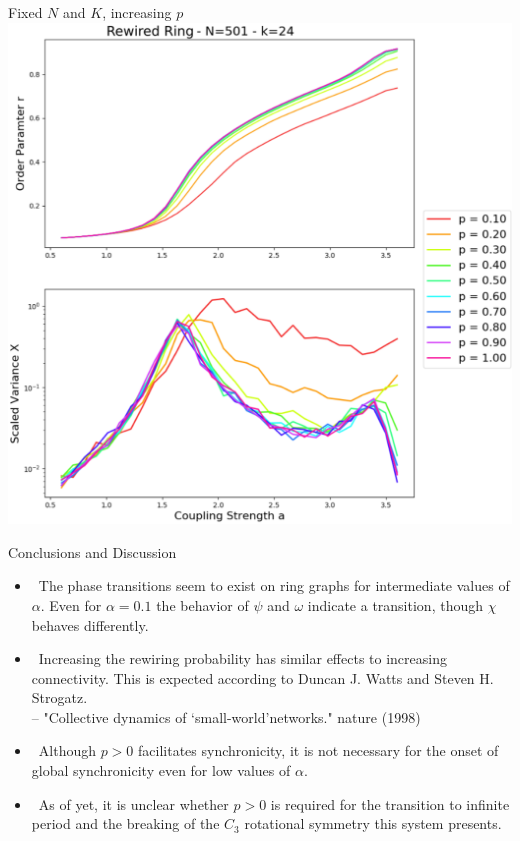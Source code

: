 \documentclass[serif,mathserif]{beamer}
\begin{document}
\begin{frame}
    \centering
    Fixed $N$ and $K$, increasing $p$\\
    \vspace{0.25cm}
    \includegraphics[height=0.8\textheight]{./rvsavsp.eps}
\end{frame}

\begin{frame}{Conclusions and Discussion}
    \begin{itemize}
        \item \ \pause The phase transitions seem to exist on ring graphs for intermediate values of $\alpha$. Even for $\alpha=0.1$ the behavior of $\psi$ and $\omega$ indicate a transition, though $\chi$ behaves differently.
        \vspace{0.1cm}
        \item \ \pause Increasing the rewiring probability has similar effects to increasing connectivity. This is expected according to Duncan J. Watts and Steven H. Strogatz.\\
            \hfill -- "Collective dynamics of ‘small-world’networks." nature (1998)
        \vspace{0.1cm}
        \item \ \pause Although $p>0$ facilitates synchronicity, it is not necessary for the onset of global synchronicity even for low values of $\alpha$.
        \vspace{0.1cm}
    \item \ \pause As of yet, it is unclear whether $p>0$ is required for the transition to infinite period and the breaking of the $C_3$ rotational symmetry this system presents.
    \end{itemize}
\end{frame}
\end{document}
